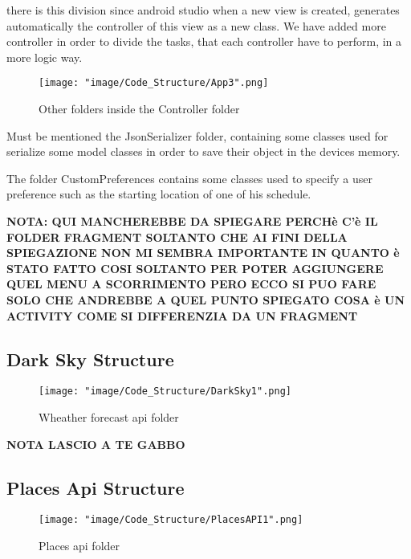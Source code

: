 there is this division since android studio when a new view is created, generates automatically the controller of this view as a new class. We have added more controller in order to divide the tasks, that each controller have to perform, in a more logic way.

\begin{figure}[H]
\begin{center}
\texttt{[image: "image/Code\_Structure/App3".png]}
\caption{Other folders inside the Controller folder}
\end{center}
\end{figure}

Must be mentioned the JsonSerializer folder, containing some classes used for serialize some model classes in order to save their object in the devices memory.

The folder CustomPreferences contains some classes used to specify a user preference such as the starting location of one of his schedule.

\textbf{NOTA: QUI MANCHEREBBE DA SPIEGARE PERCHè C'è IL FOLDER FRAGMENT SOLTANTO CHE AI FINI DELLA SPIEGAZIONE NON MI SEMBRA IMPORTANTE IN QUANTO è STATO FATTO COSI SOLTANTO PER POTER AGGIUNGERE QUEL MENU A SCORRIMENTO PERO ECCO SI PUO FARE SOLO CHE ANDREBBE A QUEL PUNTO SPIEGATO COSA è UN ACTIVITY COME SI DIFFERENZIA DA UN FRAGMENT}

\subsection{Dark Sky Structure}

\begin{figure}[H]
\begin{center}
\texttt{[image: "image/Code\_Structure/DarkSky1".png]}
\caption{Wheather forecast api folder}
\end{center}
\end{figure}

\textbf{NOTA LASCIO A TE GABBO}

\subsection{Places Api Structure}

\begin{figure}[H]
\begin{center}
\texttt{[image: "image/Code\_Structure/PlacesAPI1".png]}
\caption{Places api folder}
\end{center}
\end{figure}

